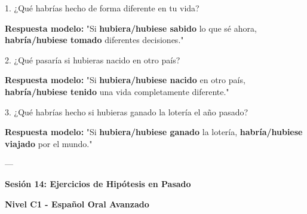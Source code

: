 \documentclass[a4paper,11pt]{article}
\begin{document}
1. ¿Qué habrías hecho de forma diferente en tu vida?

\textbf{Respuesta modelo:} "Si \textbf{hubiera/hubiese sabido} lo que sé ahora, \textbf{habría/hubiese tomado} diferentes decisiones."

\vspace{0.2cm}

2. ¿Qué pasaría si hubieras nacido en otro país?

\textbf{Respuesta modelo:} "Si \textbf{hubiera/hubiese nacido} en otro país, \textbf{habría/hubiese tenido} una vida completamente diferente."

\vspace{0.2cm}

3. ¿Qué habrías hecho si hubieras ganado la lotería el año pasado?

\textbf{Respuesta modelo:} "Si \textbf{hubiera/hubiese ganado} la lotería, \textbf{habría/hubiese viajado} por el mundo."

\vspace{0.2cm}

---

\vspace{0.2cm}

\textbf{Sesión 14: Ejercicios de Hipótesis en Pasado}

\textbf{Nivel C1 - Español Oral Avanzado}

\vspace{0.2cm}
\end{document}
